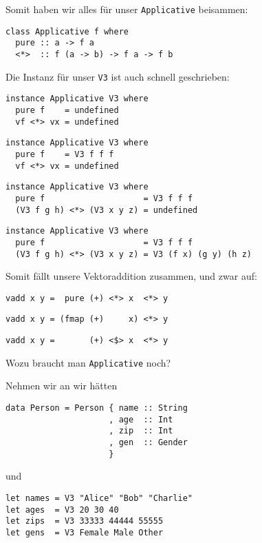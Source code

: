 \documentclass{beamer}
\begin{document}
\begin{frame}[fragile]
Somit haben wir alles für unser \texttt{Applicative} beisammen:\smallskip

\begin{verbatim}
class Applicative f where
  pure :: a -> f a
  <*>  :: f (a -> b) -> f a -> f b
\end{verbatim}
\pause
Die Instanz für unser \texttt{V3} ist auch schnell geschrieben:
\begin{overprint}
\begin{verbatim}
instance Applicative V3 where
  pure f    = undefined
  vf <*> vx = undefined
\end{verbatim}
\begin{verbatim}
instance Applicative V3 where
  pure f    = V3 f f f
  vf <*> vx = undefined
\end{verbatim}
\begin{verbatim}
instance Applicative V3 where
  pure f                    = V3 f f f
  (V3 f g h) <*> (V3 x y z) = undefined
\end{verbatim}
\begin{verbatim}
instance Applicative V3 where
  pure f                    = V3 f f f
  (V3 f g h) <*> (V3 x y z) = V3 (f x) (g y) (h z)
\end{verbatim}
\end{overprint}
\pause
\pause
\pause
\pause
\bigskip

Somit fällt unsere Vektoraddition zusammen, und zwar auf:
\begin{overprint}
\begin{verbatim}
vadd x y =  pure (+) <*> x  <*> y
\end{verbatim}
\begin{verbatim}
vadd x y = (fmap (+)     x) <*> y
\end{verbatim}
\begin{verbatim}
vadd x y =       (+) <$> x  <*> y
\end{verbatim}
\end{overprint}
\end{frame}


\begin{frame}[fragile]
Wozu braucht man \texttt{Applicative} noch?\\\par \pause
Nehmen wir an wir hätten
\begin{verbatim}
data Person = Person { name :: String
                     , age  :: Int
                     , zip  :: Int
                     , gen  :: Gender
                     }
\end{verbatim}
\pause
und
\begin{verbatim}
let names = V3 "Alice" "Bob" "Charlie"
let ages  = V3 20 30 40
let zips  = V3 33333 44444 55555
let gens  = V3 Female Male Other
\end{verbatim}
\end{frame}
\end{document}
